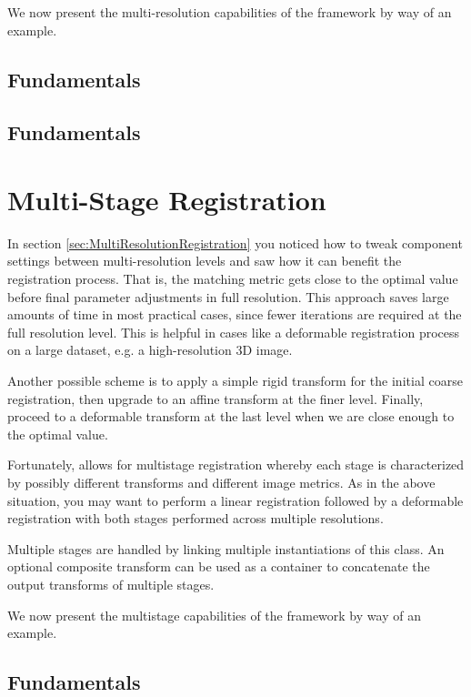 We now present the multi-resolution capabilities of the framework by
way of an example.

\subsection{Fundamentals}


\subsection{Fundamentals}


\section{Multi-Stage Registration}
\label{sec:MultiStageRegistration}
In section \ref{sec:MultiResolutionRegistration} you noticed how to tweak
component settings between multi-resolution levels and saw how it can benefit the
registration process. That is, the matching metric gets close to the optimal
value before final parameter adjustments in full resolution.
This approach saves large amounts of time in most practical
cases, since fewer iterations are required at the full resolution level.
This is helpful in cases like a deformable registration process on a large
dataset, e.g. a high-resolution 3D image.

Another possible scheme is to apply a simple rigid transform for the initial coarse
registration, then upgrade to an affine transform at the finer level. Finally,
proceed to a deformable transform at the last level when we are close enough to
the optimal value.

Fortunately,  allows for multistage registration
whereby each stage is characterized by possibly different transforms and different
image metrics. As in the above situation, you may want to perform a linear registration
followed by a deformable registration with both stages performed across multiple
resolutions.

Multiple stages are handled by linking multiple instantiations of this class.
An optional composite transform can be used as a container to concatenate
the output transforms of multiple stages.

We now present the multistage capabilities of the framework by way of an example.

\subsection{Fundamentals}


